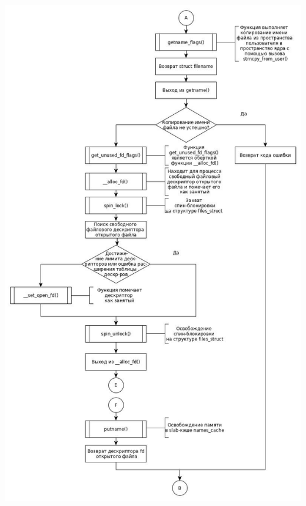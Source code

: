 \documentclass[a4paper,14pt]{extreport} %
\begin{document}
\newpage
\includegraphics[scale=0.57]{2.jpg}
\end{document}
